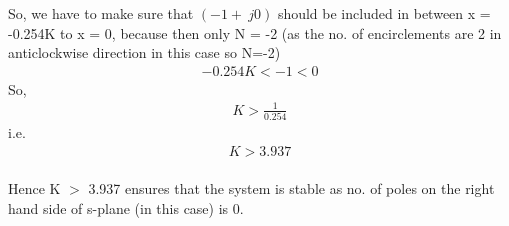 So, we have to make sure that $(-1+\ j0)$ should be included in between x = -0.254K to x = 0, because then only N = -2 (as the no. of encirclements are 2 in anticlockwise direction in this case so N=-2)
\begin{align}
-0.254K < -1 < 0
\end{align}
So,
\begin{align}
K > \frac{1}{0.254}
\end{align}
i.e.
\begin{align}
K > 3.937
\end{align}
\\
Hence K $>$ 3.937 ensures that the system is stable as no. of poles on the right hand side of s-plane (in this case) is 0.
